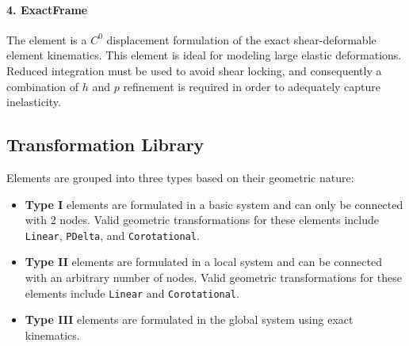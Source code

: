 \paragraph{4. ExactFrame}
  The \ExactFrame{} element is a \(C^0\) displacement formulation of
  the exact shear-deformable element kinematics. 
  This element is ideal
  for modeling large elastic deformations. 
  Reduced integration must be
  used to avoid shear locking, and consequently a combination of \(h\)
  and \(p\) refinement is required in order to adequately capture
  inelasticity.





\subsection{Transformation Library}\label{sec:transformation-types}

Elements are grouped into three types based on their geometric nature:

\begin{itemize}
\tightlist
\item
  \textbf{Type I} elements are formulated in a basic system and can only
  be connected with 2 nodes. 
  Valid geometric transformations for these
  elements include \texttt{Linear}, \texttt{PDelta}, and
  \texttt{Corotational}.
\item
  \textbf{Type II} elements are formulated in a local system and can be
  connected with an arbitrary number of nodes. Valid geometric
  transformations for these elements include \texttt{Linear} and
  \texttt{Corotational}.
\item
  \textbf{Type III} elements are formulated in the global system using
  exact kinematics.
\end{itemize}

